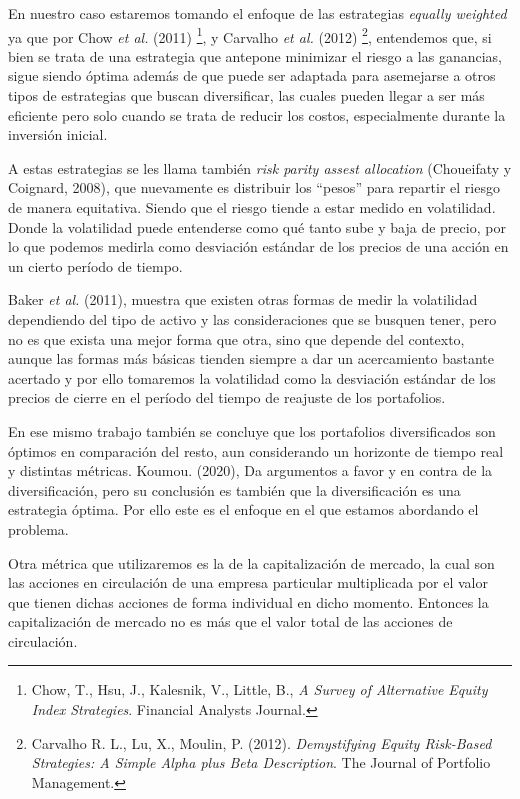 \documentclass[
]{article}
\begin{document}
En nuestro caso estaremos tomando el enfoque de las estrategias
\emph{equally weighted} ya que por Chow \emph{et al.} (2011)
\footnote{ Chow, T., Hsu, J., Kalesnik, V., Little, B., 
\emph{A Survey of Alternative Equity Index Strategies}. Financial Analysts Journal.}, 
y Carvalho \emph{et al.} (2012) \footnote{  Carvalho R. L., Lu, X., Moulin, P. (2012).
\emph{Demystifying Equity Risk-Based Strategies: A Simple Alpha plus Beta Description}. 
The Journal of Portfolio Management.}, entendemos que, si bien se trata de una estrategia
que antepone minimizar el riesgo a las ganancias, sigue siendo óptima
además de que puede ser adaptada para asemejarse a otros tipos de
estrategias que buscan diversificar, las cuales pueden llegar a ser más
eficiente pero solo cuando se trata de reducir los costos, especialmente
durante la inversión inicial.

A estas estrategias se les llama también \emph{risk parity assest
allocation} (Choueifaty y Coignard, 2008), que nuevamente es distribuir
los ``pesos'' para repartir el riesgo de manera equitativa. Siendo que
el riesgo tiende a estar medido en volatilidad. Donde la volatilidad
puede entenderse como qué tanto sube y baja de precio, por lo que
podemos medirla como desviación estándar de los precios de una acción en
un cierto período de tiempo.

Baker \emph{et al.} (2011), muestra que existen otras formas de medir la
volatilidad dependiendo del tipo de activo y las consideraciones que se
busquen tener, pero no es que exista una mejor forma que otra, sino que
depende del contexto, aunque las formas más básicas tienden siempre a
dar un acercamiento bastante acertado y por ello tomaremos la
volatilidad como la desviación estándar de los precios de cierre en el
período del tiempo de reajuste de los portafolios.

En ese mismo trabajo también se concluye que los portafolios
diversificados son óptimos en comparación del resto, aun considerando un
horizonte de tiempo real y distintas métricas. Koumou. (2020), Da
argumentos a favor y en contra de la diversificación, pero su conclusión
es también que la diversificación es una estrategia óptima. Por ello
este es el enfoque en el que estamos abordando el problema.

Otra métrica que utilizaremos es la de la capitalización de mercado, la
cual son las acciones en circulación de una empresa particular
multiplicada por el valor que tienen dichas acciones de forma individual
en dicho momento. Entonces la capitalización de mercado no es más que el
valor total de las acciones de circulación.
\end{document}
